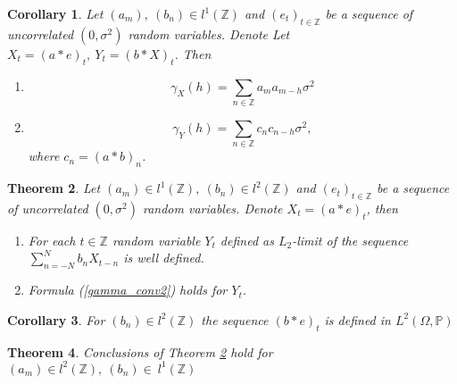 \documentclass[12pt]{article}
\newtheorem{theorem}{Theorem}[section]
\newtheorem{corollary}[theorem]{Corollary}
\theoremstyle{definition}
\theoremstyle{remark}
\numberwithin{equation}{section}
\newcommand{\PP}{\mathbb{P}}
\newcommand{\ZZ}{\mathbb{Z}}
\begin{document}
\begin{corollary}
	 Let $(a_m),\ (b_n)\in l^1(\ZZ)$ and $(e_t)_{t\in\ZZ}$ be a sequence of uncorrelated $(0, \sigma^2)$ random variables. Denote Let $X_t = (a*e)_t,\ Y_t = (b*X)_t$. Then
	\begin{enumerate}
		\item
		\begin{equation*}\label{gamma_conv1}
			\gamma_X(h) = \sum_{n\in\ZZ}a_ma_{m-h}\sigma^2
		\end{equation*}
		\item
		\begin{equation}\label{gamma_conv2}
			\gamma_Y(h) = \sum_{n\in\ZZ}c_nc_{n-h}\sigma^2,
		\end{equation}
	where $c_n = (a*b)_n$.
	\end{enumerate}
\end{corollary}

\begin{theorem}\label{convl1l2}
	Let $(a_m)\in l^1(\ZZ),\ (b_n)\in l^2(\ZZ)$ and $(e_t)_{t\in\ZZ}$ be a sequence of uncorrelated $(0, \sigma^2)$ random variables. Denote $X_t = (a*e)_t$, then
	\begin{enumerate}
		\item For each $t\in\ZZ$ random variable $Y_t$ defined as $L_2$-limit of the sequence $\sum_{n = - N}^Nb_nX_{t-n}$ is well defined.
		\item  Formula (\ref{gamma_conv2}) holds for $Y_t$.
	\end{enumerate}
\end{theorem}

\begin{corollary}
	For $(b_n)\in l^2(\ZZ)$ the sequence $(b*e)_t$ is defined in $L^2(\Omega, \PP)$
\end{corollary}

\begin{theorem}
	Conclusions of Theorem \ref{convl1l2} hold for $(a_m)\in l^2(\ZZ),\ (b_n)\in~l^1(\ZZ)$
\end{theorem}
\end{document}

